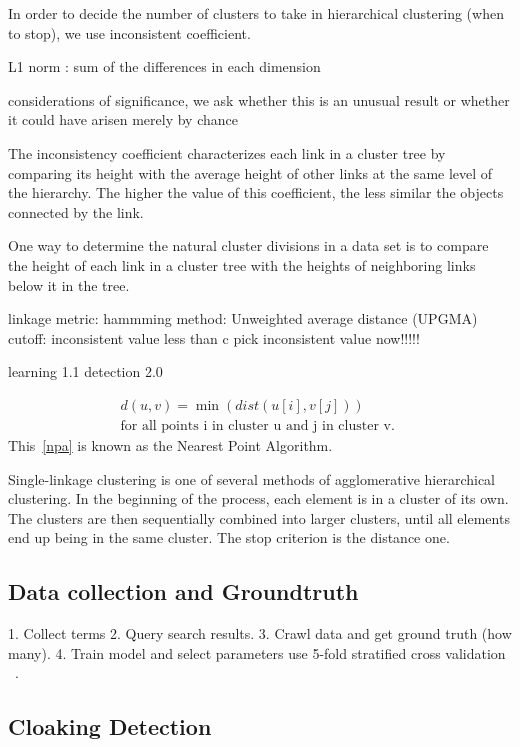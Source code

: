 In order to decide the number of clusters to take in hierarchical clustering
(when to stop), we use inconsistent coefficient.


L1 norm : sum of the differences in
each dimension

considerations of significance, we ask whether this is an unusual result or
whether it could have arisen merely by chance


The inconsistency coefficient characterizes each link in a cluster tree by
comparing its height with the average height of other links at the same level of
the hierarchy. The higher the value of this coefficient, the less similar the
objects connected by the link.

One way to determine the natural cluster divisions in a data set is to compare
the height of each link in a cluster tree with the heights of neighboring links
below it in the tree.

linkage metric: hammming
method: Unweighted average distance (UPGMA)
cutoff: inconsistent value less than c
pick inconsistent value now!!!!!

learning 1.1
detection 2.0


\begin{gather*} \label{npa}
  d(u,v) = \min(dist(u[i],v[j])) \\
  \text{for all points i in cluster u and j in
  cluster v. }
\end{gather*}
This~\autoref{npa} is known as the Nearest Point Algorithm.

Single-linkage clustering is one of several methods of agglomerative
hierarchical clustering. In the beginning of the process, each element is in a
cluster of its own. The clusters are then sequentially combined into larger
clusters, until all elements end up being in the same cluster. The stop
criterion is the distance one.


\subsection{Data collection and Groundtruth}

1. Collect terms
2. Query search results.
3. Crawl data and get ground truth (how
many).
4. Train model and select parameters use 5-fold stratified cross validation
~\cite{scikit-learn}.

\subsection{Cloaking Detection}



